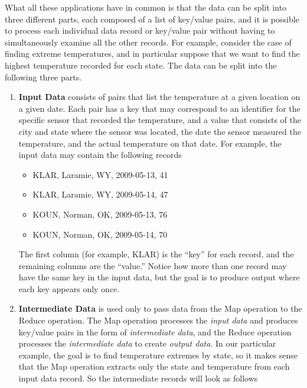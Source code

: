 What all these applications have in common is that the data can
be split into three different parts, each composed of a list of
key/value pairs, and it is possible to process each individual 
data record or key/value pair without having to simultaneously 
examine all the other records.  For
example, consider the case of finding extreme temperatures,
and in particular suppose that we want to find the highest 
temperature recorded for each state.
The data can be split into the following three parts.
\begin{enumerate}
    \item \textbf{Input Data} consists of pairs that list the 
        temperature at a given location on a given date. Each
        pair has a key that may correspond to an identifier
        for the specific sensor that recorded the temperature,
        and a value that consists of the city and state where
        the sensor was located, the date the sensor measured
        the temperature, and the actual temperature on that date.
        For example, the input data may contain the following
        records
        \begin{itemize}
            \item KLAR, Laramie, WY, 2009-05-13, 41
            \item KLAR, Laramie, WY, 2009-05-14, 47
            \item KOUN, Norman,  OK, 2009-05-13, 76
            \item KOUN, Norman,  OK, 2009-05-14, 70
        \end{itemize}
        The first column (for example, KLAR) is the ``key'' for each record,
        and the remaining columns are the ``value.'' Notice how 
        more than one record may have the same key in the input data,
        but the goal is to produce output where each key appears only
        once.
    \item \textbf{Intermediate Data} is used only to pass data from
        the Map operation to the Reduce operation. The Map operation
        processes the \emph{input data} and produces key/value pairs
        in the form of \emph{intermediate data}, and the Reduce operation
        processes the \emph{intermediate data} to create \emph{output data}.
        In our particular example, the goal is to find temperature extremes
        by state, so it makes sense that the Map operation extracts only
        the state and temperature from each input data record. So the
        intermediate records will look as follows
        \begin{itemize}

\end{itemize}
\end{enumerate}
